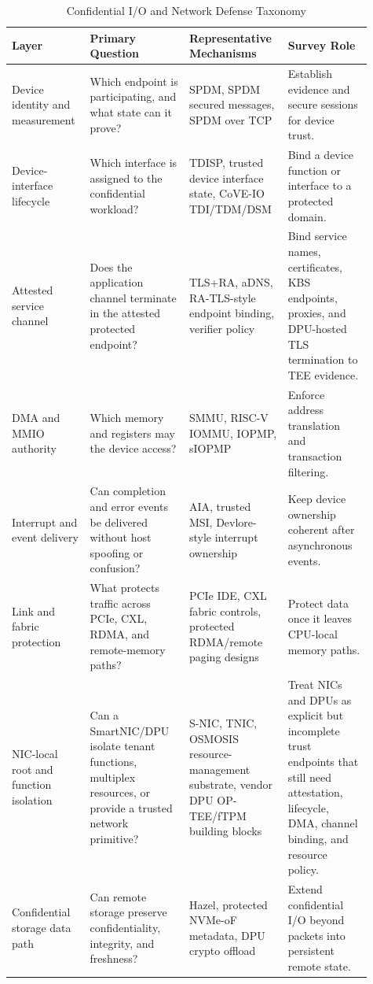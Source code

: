 \begin{table}[t]
\centering
\caption{Confidential I/O and Network Defense Taxonomy}
\label{tab:confidential_io_taxonomy}
\begin{tabular}{@{}p{0.18\linewidth}p{0.26\linewidth}p{0.25\linewidth}p{0.22\linewidth}@{}}
\toprule
\textbf{Layer} & \textbf{Primary Question} & \textbf{Representative Mechanisms} & \textbf{Survey Role} \\ \midrule
Device identity and measurement & Which endpoint is participating, and what state can it prove? & SPDM, SPDM secured messages, SPDM over TCP & Establish evidence and secure sessions for device trust. \\
Device-interface lifecycle & Which interface is assigned to the confidential workload? & TDISP, trusted device interface state, CoVE-IO TDI/TDM/DSM & Bind a device function or interface to a protected domain. \\
Attested service channel & Does the application channel terminate in the attested protected endpoint? & TLS+RA, aDNS, RA-TLS-style endpoint binding, verifier policy & Bind service names, certificates, KBS endpoints, proxies, and DPU-hosted TLS termination to TEE evidence. \\
DMA and MMIO authority & Which memory and registers may the device access? & SMMU, RISC-V IOMMU, IOPMP, sIOPMP & Enforce address translation and transaction filtering. \\
Interrupt and event delivery & Can completion and error events be delivered without host spoofing or confusion? & AIA, trusted MSI, Devlore-style interrupt ownership & Keep device ownership coherent after asynchronous events. \\
Link and fabric protection & What protects traffic across PCIe, CXL, RDMA, and remote-memory paths? & PCIe IDE, CXL fabric controls, protected RDMA/remote paging designs & Protect data once it leaves CPU-local memory paths. \\
NIC-local root and function isolation & Can a SmartNIC/DPU isolate tenant functions, multiplex resources, or provide a trusted network primitive? & S-NIC, TNIC, OSMOSIS resource-management substrate, vendor DPU OP-TEE/fTPM building blocks & Treat NICs and DPUs as explicit but incomplete trust endpoints that still need attestation, lifecycle, DMA, channel binding, and resource policy. \\
Confidential storage data path & Can remote storage preserve confidentiality, integrity, and freshness? & Hazel, protected NVMe-oF metadata, DPU crypto offload & Extend confidential I/O beyond packets into persistent remote state. \\

\end{tabular}
\end{table}
